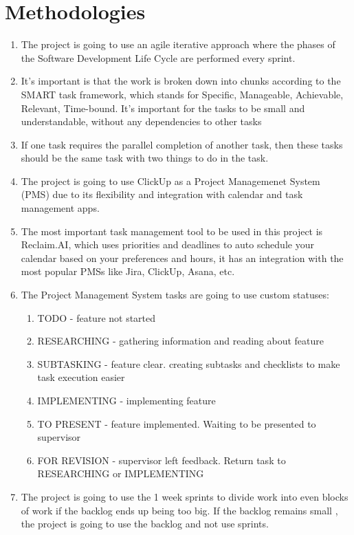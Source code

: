 \section{Methodologies}
\begin{enumerate}
    \item The project is going to use an agile iterative approach where the phases of the Software Development Life Cycle are performed every sprint.

    \item It's important is that the work is broken down into chunks according to the SMART task framework, which stands for Specific, Manageable, Achievable, Relevant, Time-bound. It's important for the tasks to be small and understandable, without any dependencies to other tasks
    \item If one task requires the parallel completion of another task, then these tasks should be the same task with two things to do in the task. 
    \item The project is going to use ClickUp as a Project Managemenet System (PMS) due to its flexibility and integration with calendar and task management apps. 
    \item The most important task management tool to be used in this project is Reclaim.AI, which uses priorities and deadlines to auto schedule your calendar based on your preferences and hours, it has an integration with the most popular PMSs like Jira, ClickUp, Asana, etc. 
    \item The Project Management System tasks are going to use custom statuses:
    \begin{enumerate}
        \item TODO - feature not started
        \item RESEARCHING - gathering information and reading about feature
        \item SUBTASKING - feature clear. creating subtasks and checklists to make task execution easier
        \item IMPLEMENTING - implementing feature
        \item TO PRESENT - feature implemented. Waiting to be presented to supervisor
        \item FOR REVISION - supervisor left feedback. Return task to RESEARCHING or IMPLEMENTING
    \end{enumerate}
    \item The project is going to use the 1 week sprints to divide work into even blocks of work if the backlog ends up being too big. If the backlog remains small , the project is going to use the backlog and not use sprints. 
\end{enumerate}
